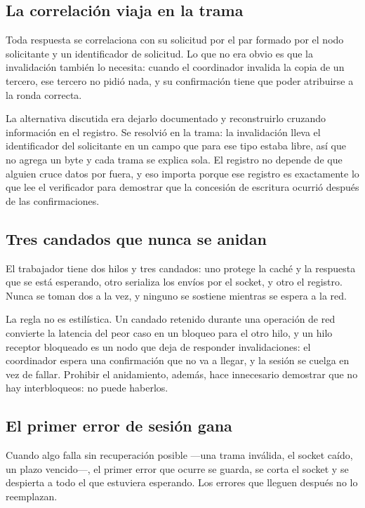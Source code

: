 \subsection{La correlación viaja en la trama}

Toda respuesta se correlaciona con su solicitud por el par formado por el nodo
solicitante y un identificador de solicitud. Lo que no era obvio es que la
invalidación también lo necesita: cuando el coordinador invalida la copia de
un tercero, ese tercero no pidió nada, y su confirmación tiene que poder
atribuirse a la ronda correcta.

La alternativa discutida era dejarlo documentado y reconstruirlo cruzando
información en el registro. Se resolvió en la trama: la invalidación lleva el
identificador del solicitante en un campo que para ese tipo estaba libre, así
que no agrega un byte y cada trama se explica sola. El registro no depende de
que alguien cruce datos por fuera, y eso importa porque ese registro es
exactamente lo que lee el verificador para demostrar que la concesión de
escritura ocurrió después de las confirmaciones.

\subsection{Tres candados que nunca se anidan}

El trabajador tiene dos hilos y tres candados: uno protege la caché y la
respuesta que se está esperando, otro serializa los envíos por el socket, y
otro el registro. Nunca se toman dos a la vez, y ninguno se sostiene mientras
se espera a la red.

La regla no es estilística. Un candado retenido durante una operación de red
convierte la latencia del peor caso en un bloqueo para el otro hilo, y un hilo
receptor bloqueado es un nodo que deja de responder invalidaciones: el
coordinador espera una confirmación que no va a llegar, y la sesión se cuelga
en vez de fallar. Prohibir el anidamiento, además, hace innecesario demostrar
que no hay interbloqueos: no puede haberlos.

\subsection{El primer error de sesión gana}

Cuando algo falla sin recuperación posible —una trama inválida, el socket
caído, un plazo vencido—, el primer error que ocurre se guarda, se corta el
socket y se despierta a todo el que estuviera esperando. Los errores que
lleguen después no lo reemplazan.

